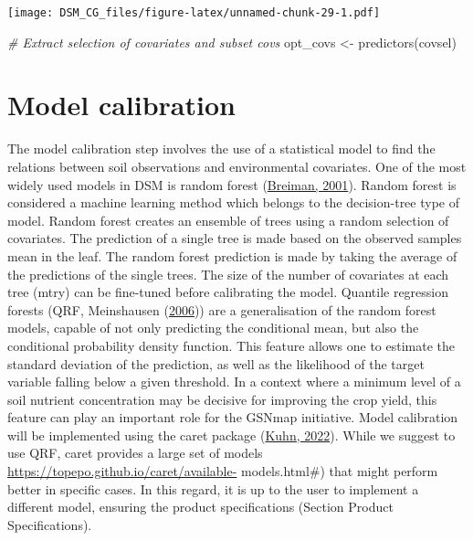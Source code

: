 \documentclass[
  10pt,
  b5paper,
  oneside]{book}
\newenvironment{Shaded}{\begin{snugshade}}{\end{snugshade}}
\newcommand{\CommentTok}[1]{\textcolor[rgb]{0.56,0.35,0.01}{\textit{#1}}}
\newcommand{\FunctionTok}[1]{\textcolor[rgb]{0.00,0.00,0.00}{#1}}
\newcommand{\NormalTok}[1]{#1}
\newcommand{\OtherTok}[1]{\textcolor[rgb]{0.56,0.35,0.01}{#1}}
\begin{document}
\texttt{[image: DSM\_CG\_files/figure-latex/unnamed-chunk-29-1.pdf]}

\begin{Shaded}
\begin{Highlighting}[]
\CommentTok{\# Extract selection of covariates and subset covs}
\NormalTok{opt\_covs }\OtherTok{\textless{}{-}} \FunctionTok{predictors}\NormalTok{(covsel)}
\end{Highlighting}
\end{Shaded}

\hypertarget{model-calibration}{%
\section{Model calibration}\label{model-calibration}}

The model calibration step involves the use of a statistical model to find the relations between soil observations and environmental covariates. One of the most widely used models in DSM is random forest (\protect\hyperlink{ref-Breiman2001}{Breiman, 2001}). Random forest is considered a machine learning method which belongs to the decision-tree type of model. Random forest creates an ensemble of trees using a random selection of covariates. The prediction of a single tree is made based on the observed samples mean in the leaf. The random forest prediction is made by taking the average of the predictions of the single trees. The size of the number of covariates at each tree (mtry) can be fine-tuned before calibrating the model.
Quantile regression forests (QRF, Meinshausen (\protect\hyperlink{ref-Meinshausen2006}{2006})) are a generalisation of the random forest models, capable of not only predicting the conditional mean, but also the conditional probability density function. This feature allows one to estimate the standard deviation of the prediction, as well as the likelihood of the target variable falling below a given threshold. In a context where a minimum level of a soil nutrient concentration may be decisive for improving the crop yield, this feature can play an important role for the GSNmap initiative.
Model calibration will be implemented using the caret package (\protect\hyperlink{ref-Kuhn2022}{Kuhn, 2022}). While we suggest to use QRF, caret provides a large set of models \url{https://topepo.github.io/caret/available-} models.html\#) that might perform better in specific cases. In this regard, it is up to the user to implement a different model, ensuring the product specifications (Section Product Specifications).
\end{document}
